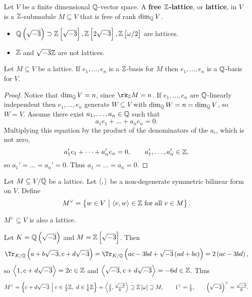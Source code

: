 
\begin{definition}
Let $ V $ be a finite dimensional $ \mathbb{Q} $-vector space. A \textbf{free $ \mathbb{Z} $-lattice}, or \textbf{lattice}, in $ V $ is a $ \mathbb{Z} $-submodule $ M \subseteq V $ that is free of rank $ \dim_{\mathbb{Q}} V $.
\end{definition}

\begin{example*}
\hfill
\begin{itemize}
\item $ \QQ\br{\sqrt{-3}} \supset \ZZ\sbr{\sqrt{-3}}, \ZZ\sbr{2\sqrt{-3}}, \ZZ\sbr{\omega / 2} $ are lattices.
\item $ \mathbb{Z} $ and $ \sqrt{-3}\mathbb{Z} $ are not lattices.
\end{itemize}
\end{example*}

\begin{lemma}
Let $ M \subseteq V $ be a lattice. If $ e_1, \dots, e_n $ is a $ \mathbb{Z} $-basis for $ M $ then $ e_1, \dots, e_n $ is a $ \mathbb{Q} $-basis for $ V $.
\end{lemma}

\begin{proof}
Notice that $ \dim_{\mathbb{Q}} V = n $, since $ \rk_\ZZ M = n $. If $ e_1, \dots, e_n $ are $ \mathbb{Q} $-linearly independent then $ e_1, \dots, e_n $ generate $ W \subseteq V $ with $ \dim_{\mathbb{Q}} W = n = \dim_{\mathbb{Q}} V $, so $ W = V $. Assume there exist $ a_1, \dots, a_n \in \mathbb{Q} $ such that
$$ a_1e_1 + \dots + a_ne_n = 0. $$
Multiplying this equation by the product of the denominators of the $ a_i $, which is not zero,
$$ a_1'e_1 + \dots + a_n'e_n = 0, \qquad a_1', \dots, a_n' \in \mathbb{Z}, $$
so $ a_1' = \dots = a_n' = 0 $. Thus $ a_1 = \dots = a_n = 0 $.
\end{proof}

Let $ M \subseteq V / \mathbb{Q} $ be a lattice. Let $ \left\langle , \right\rangle $ be a non-degenerate symmetric bilinear form on $ V $. Define
$$ M^\vee = \cbr{w \in V \st \abr{v, w} \in \ZZ \ \text{for all} \ v \in M}. $$

\begin{proposition}
\label{prop:duallattice}
$ M^\vee \subseteq V $ is also a lattice.
\end{proposition}

\begin{example*}
Let $ K = \QQ\br{\sqrt{-3}} $ and $ M = \ZZ\sbr{\sqrt{-3}} $. Then
$$ \Tr_{K / \QQ}\br{a + b\sqrt{-3}, c + d\sqrt{-3}} = \Tr_{K / \QQ} \br{ac - 3bd + \sqrt{-3}\br{ad + bc}} = 2\br{ac - 3bd}, $$
so $ \left\langle 1, c + d\sqrt{-3} \right\rangle = 2c \in \mathbb{Z} $ and $ \left\langle \sqrt{-3}, c + d\sqrt{-3} \right\rangle = -6d \in \mathbb{Z} $. Thus
$$ M^\vee = \cbr{c + d\sqrt{-3} \st c \in \tfrac{1}{2}\ZZ, \ d \in \tfrac{1}{6}\ZZ} = \abr{\tfrac{1}{2}, \tfrac{\sqrt{-3}}{6}} \supseteq \ZZ\sbr{\omega} \supseteq M, \qquad 1^\vee = \tfrac{1}{2}, \qquad \br{\sqrt{-3}}^\vee = \tfrac{\sqrt{-3}}{6}. $$
\end{example*}

